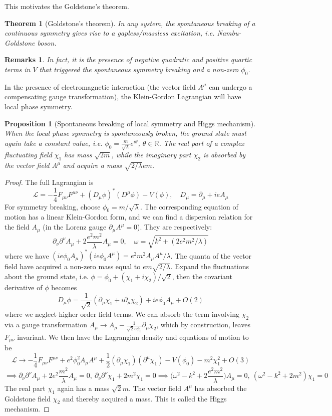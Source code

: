 \documentclass[a4paper]{article}
\newtheorem{remarks}{Remarks}[section]
\theoremstyle{new}
\newtheorem{thm}{Theorem}[section]
\newtheorem{prop}{Proposition}[section]
\begin{document}
This motivates the Goldstone's theorem.
\begin{thm}[Goldstone's theorem]
In any system, the spontaneous breaking of a continuous symmetry gives rise to a gapless/massless excitation, i.e. Nambu-Goldstone boson.
\end{thm}
\begin{remarks}
In fact, it is the presence of negative quadratic and positive quartic terms in $V$ that triggered the spontaneous symmetry breaking and a non-zero $\phi_0$.
\end{remarks}
In the presence of electromagnetic interaction (the vector field $A^\mu$ can undergo a compensating gauge transformation), the Klein-Gordon Lagrangian will have local phase symmetry. 
\begin{prop}[Spontaneous breaking of local symmetry and Higgs mechanism]
When the local phase symmetry is spontaneously broken, the ground state must again take a constant value, i.e. $\phi_0=\frac{m}{\sqrt{\lambda}}e^{i\theta}$, $\theta\in\mathbb{R}$. The real part of a complex fluctuating field $\chi_1$ has mass $\sqrt{2m}$, while the imaginary part $\chi_2$ is absorbed by the vector field $A^\mu$ and acquire a mass $\sqrt{2/\lambda}em$.
\end{prop}
\begin{proof}
The full Lagrangian is
$$\mathcal{L}=-\frac{1}{4}F_{\mu\nu}F^{\mu\nu}+(D_\mu\phi)^*(D^\mu\phi)-V(\phi),\quad D_\mu=\partial_\mu+ieA_\mu$$
For symmetry breaking, choose $\phi_0=m/\sqrt{\lambda}$. The corresponding equation of motion has a linear Klein-Gordon form, and we can find a dispersion relation for the field $A_\mu$ (in the Lorenz gauge $\partial_\mu A^\mu=0$). They are respectively:
$$\partial_\nu\partial^\nu A_\mu+2\frac{e^2m^2}{\lambda}A_\mu=0,\quad\omega=\sqrt{k^2+(2e^2m^2/\lambda)}$$
where we have $(ie\phi_0A_\mu)^*(ie\phi_0A^\mu)=e^2m^2A_\mu A^\mu/\lambda$. The quanta of the vector field have acquired a non-zero mass equal to $em\sqrt{2/\lambda}$. Expand the fluctuations about the ground state, i.e. $\phi=\phi_0+(\chi_1+i\chi_2)/\sqrt{2}$, then the covariant derivative of $\phi$ becomes
$$D_\mu\phi=\frac{1}{\sqrt{2}}(\partial_\mu\chi_1+i\partial_\mu\chi_2)+ie\phi_0A_\mu+O(2)$$
where we neglect higher order field terms. We can absorb the term involving $\chi_2$ via a gauge transformation $A_\mu\rightarrow A_\mu-\frac{1}{\sqrt{2}e\phi_0}\partial_\mu\chi_2$, which by construction, leaves $F_{\mu\nu}$ invariant. We then have the Lagrangian density and equations of motion to be
$$\mathcal{L}\rightarrow-\frac{1}{4}F_{\mu\nu}F^{\mu\nu}+e^2\phi_0^2A_\mu A^\mu+\frac{1}{2}(\partial_\mu\chi_1)(\partial^\mu\chi_1)-V(\phi_0)-m^2\chi_1^2+O(3)$$
$$\implies\partial_\nu\partial^\nu A_\mu+2e^2\frac{m^2}{\lambda}A_\mu=0,~\partial_\nu\partial^\nu\chi_1+2m^2\chi_1=0\implies\bigg(\omega^2-k^2+2\frac{e^2m^2}{\lambda}\bigg)A_\mu=0,~(\omega^2-k^2+2m^2)\chi_1=0$$
The real part $\chi_1$ again has a mass $\sqrt{2}m$. The vector field $A^\mu$ has absorbed the Goldstone field $\chi_2$ and thereby acquired a mass. This is called the Higgs mechanism.
\end{proof}
\end{document}
